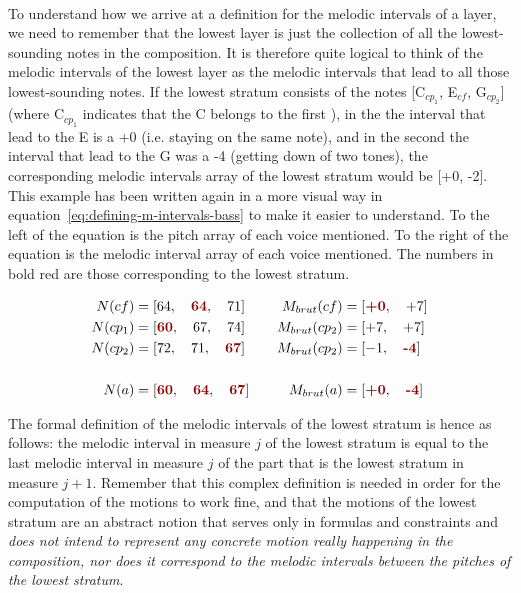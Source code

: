 \paragraph{}
To understand how we arrive at a definition for the melodic intervals of a layer, we need to remember that the lowest layer is just the collection of all the lowest-sounding notes in the composition. It is therefore quite logical to think of the melodic intervals of the lowest layer as the melodic intervals that lead to all those lowest-sounding notes. If the lowest stratum consists of the notes [C$_{cp_1}$, E$_{cf}$, G$_{cp_2}$] (where C$_{cp_1}$ indicates that the C belongs to the first \cp), in the \cfs the interval that lead to the E is a +0 (i.e. staying on the same note), and in the second \cps the interval that lead to the G was a -4 (getting down of two tones), the corresponding melodic intervals array of the lowest stratum would be [+0, -2]. This example has been written again in a more visual way in equation~\ref{eq:defining-m-intervals-bass} to make it easier to understand. To the left of the equation is the pitch array of each voice mentioned. To the right of the equation is the melodic interval array of each voice mentioned. The numbers in bold red are those corresponding to the lowest stratum.


\begin{equation}
    \begin{aligned}        
    N(cf) &= [64,\quad  \textcolor{darkred}{\textbf{64}},\quad  71] \quad 
    &M_{brut}(cf) &= [\textcolor{darkred}{\textbf{+0}}, \quad +7]\\
    N(cp_1) &= [\textcolor{darkred}{\textbf{60}},\quad  67,\quad  74] \quad 
    &M_{brut}(cp_2) &= [+7, \quad +7]\\
    N(cp_2) &= [72,\quad  71,\quad  \textcolor{darkred}{\textbf{67}}] \quad 
    &M_{brut}(cp_2) &= [-1, \quad \textcolor{darkred}{\textbf{-4}}]\\
    \\
    N(a) &= [\textcolor{darkred}{\textbf{60}},\quad  \textcolor{darkred}{\textbf{64}},\quad  \textcolor{darkred}{\textbf{67}}] \quad 
    &M_{brut}(a) &= [\textcolor{darkred}{\textbf{+0}}, \quad \textcolor{darkred}{\textbf{-4}}]\\
\end{aligned}
\label{eq:defining-m-intervals-bass}
\end{equation}


The formal definition of the melodic intervals of the lowest stratum is hence as follows: the melodic interval in measure $j$ of the lowest stratum is equal to the last melodic interval in measure $j$ of the part that is the lowest stratum in measure $j+1$. Remember that this complex definition is needed in order for the computation of the motions to work fine, and that the motions of the lowest stratum are an abstract notion that serves only in formulas and constraints and \textit{does not intend to represent any concrete motion really happening in the composition, nor does it correspond to the melodic intervals between the pitches of the lowest stratum}.

